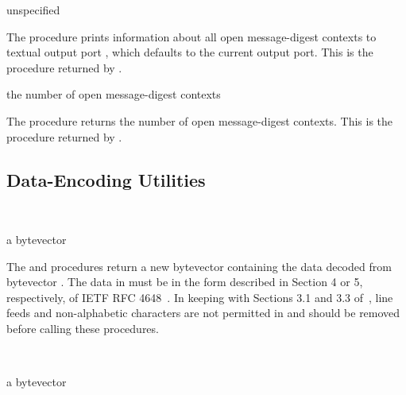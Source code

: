 \begin{procedure}
\end{procedure}
\returns{} unspecified

The  procedure prints information about all open
message-digest contexts to textual output port , which defaults to the
current output port.
This is the procedure returned by .

\begin{procedure}
\end{procedure}
\returns{} the number of open message-digest contexts

The  procedure returns the number of open
message-digest contexts.
This is the procedure returned by .

\subsection{Data-Encoding Utilities}

\begin{procedure}
  \strut\\
  \strut
\end{procedure}
\returns{} a bytevector

The  and 
procedures return a new bytevector containing the data decoded from bytevector
.
The data in  must be in the form described in Section 4 or 5,
respectively, of IETF RFC 4648~\cite{rfc4648}.
In keeping with Sections 3.1 and 3.3 of~\cite{rfc4648},
line feeds and non-alphabetic characters are not permitted
in  and should be removed before calling these procedures.

\begin{procedure}
  \strut\\
  \strut
\end{procedure}
\returns{} a bytevector

